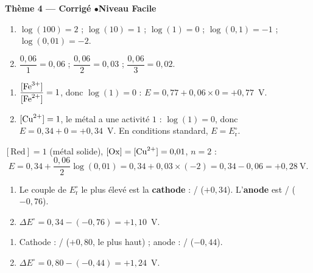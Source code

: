 \documentclass[11pt,a4paper]{article}
\begin{document}
\begin{center}\color{primarydark}\large\bfseries Thème 4 — Corrigé \quad$\bullet$\quad Niveau Facile\end{center}

\begin{corrige}
\begin{enumerate}[label=\alph*)]
  \item $\log(100)=2$ ; $\log(10)=1$ ; $\log(1)=0$ ; $\log(0{,}1)=-1$ ; $\log(0{,}01)=-2$.
  \item $\dfrac{0{,}06}{1}=0{,}06$ ; $\dfrac{0{,}06}{2}=0{,}03$ ; $\dfrac{0{,}06}{3}=0{,}02$.
\end{enumerate}
\end{corrige}

\begin{corrige}
\begin{enumerate}[label=\alph*)]
  \item $\dfrac{[\ce{Fe^{3+}}]}{[\ce{Fe^{2+}}]}=1$, donc $\log(1)=0$ :
        $E=0{,}77+0{,}06\times 0=+0{,}77$~V.
  \item $[\ce{Cu^{2+}}]=1$, le métal a une activité $1$ : $\log(1)=0$, donc
        $E=0{,}34+0=+0{,}34$~V. En conditions standard, $E=E_{\mathrm{r}}^{\circ}$.
\end{enumerate}
\end{corrige}

\begin{corrige}
$[\mathrm{Red}]=1$ (métal solide), $[\mathrm{Ox}]=[\ce{Cu^{2+}}]=0{,}01$, $n=2$ :
\[
E=0{,}34+\frac{0{,}06}{2}\log(0{,}01)=0{,}34+0{,}03\times(-2)=0{,}34-0{,}06=+0{,}28~\text{V}.
\]
\end{corrige}

\begin{corrige}
\begin{enumerate}[label=\alph*)]
  \item Le couple de $E_{\mathrm{r}}^{\circ}$ le plus élevé est la \textbf{cathode} :
        / ($+0{,}34$). L'\textbf{anode} est / ($-0{,}76$).
  \item $\Delta E^{\circ}=0{,}34-(-0{,}76)=+1{,}10$~V.
\end{enumerate}
\end{corrige}

\begin{corrige}
\begin{enumerate}[label=\alph*)]
  \item Cathode : / ($+0{,}80$, le plus haut) ; anode : /
        ($-0{,}44$).
  \item $\Delta E^{\circ}=0{,}80-(-0{,}44)=+1{,}24$~V.
\end{enumerate}
\end{corrige}
\end{document}
